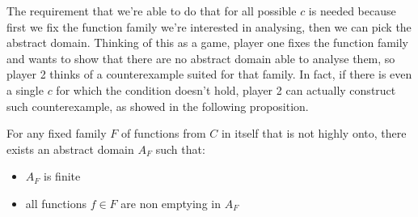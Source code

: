 The requirement that we're able to do that for all possible $c$ is needed because first we fix the function family we're interested in analysing, then we can pick the abstract domain. Thinking of this as a game, player one fixes the function family and wants to show that there are no abstract domain able to analyse them, so player 2 thinks of a counterexample suited for that family. In fact, if there is even a single $c$ for which the condition doesn't hold, player 2 can actually construct such counterexample, as showed in the following proposition.
\begin{prop}
	For any fixed family $F$ of functions from $C$ in itself that is not highly onto, there exists an abstract domain $A_F$ such that:
	\begin{itemize}
		\item $A_F$ is finite
		\item all functions $f \in F$ are non emptying in $A_F$
	\end{itemize}
\end{prop}
